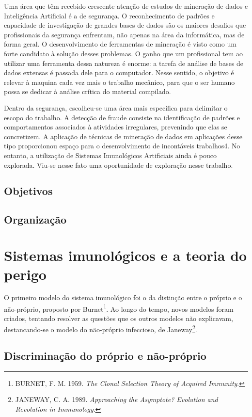 \documentclass{iiufrgs}
\begin{document}
Uma área que têm recebido crescente atenção de estudos de mineração de dados e Inteligência Artificial é a de segurança. O reconhecimento de padrões e capacidade de investigação de grandes bases de dados são os maiores desafios que profissionais da segurança enfrentam, não apenas na área da informática, mas de forma geral. O desenvolvimento de ferramentas de mineração é visto como um forte candidato à solução desses problemas. O ganho que um profissional tem ao utilizar uma ferramenta dessa natureza é enorme: a tarefa de análise de bases de dados extensas é passada dele para o computador. Nesse sentido, o objetivo é relevar à maquina cada vez mais o trabalho mecânico, para que o ser humano possa se dedicar à análise crítica do material compilado.

Dentro da segurança, escolheu-se uma área mais específica para delimitar o escopo do trabalho. A detecção de fraude consiste na identificação de padrões e comportamentos associados à atividades irregulares, prevenindo que elas se concretizem. A aplicação de técnicas de mineração de dados em aplicações desse tipo proporcionou espaço para o desenvolvimento de incontáveis trabalhos4. No entanto, a utilização de Sistemas Imunológicos Artificiais ainda é pouco explorada. Viu-se nesse fato uma oportunidade de exploração nesse trabalho.

\section{Objetivos}
\section{Organização}
\newpage

\chapter{Sistemas imunológicos e a teoria do perigo}

O primeiro modelo do sistema imunológico foi o da distinção entre o próprio e o não-próprio, proposto por Burnet\footnote{BURNET, F. M. 1959. \emph{The Clonal Selection Theory of Acquired Immunity}.}. Ao longo do tempo, novos modelos foram criados, tentando resolver as questões que os outros modelos não explicavam, destancando-se o modelo do não-próprio infeccioso, de Janeway\footnote{JANEWAY, C. A. 1989. \emph{Approaching the Asymptote? Evolution and Revolution in Immunology}.}.

\section{Discriminação do próprio e não-próprio}
\end{document}
